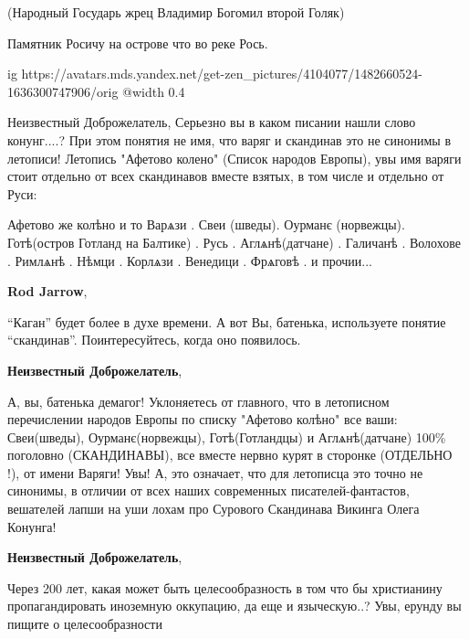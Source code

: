 \begin{itemize}
(Народный Государь жрец Владимир Богомил второй Голяк)

Памятник Росичу на острове что во реке Рось.

\ifcmt
  ig https://avatars.mds.yandex.net/get-zen_pictures/4104077/1482660524-1636300747906/orig
  @width 0.4
\fi


Неизвестный Доброжелатель, Серьезно вы в каком писании нашли слово конунг....?
При этом понятия не имя, что варяг и скандинав это не синонимы в летописи!
Летопись "Афетово колено" (Список народов Европы), увы имя варяги стоит
отдельно от всех скандинавов вместе взятых, в том числе и отдельно от Руси:

Афетово же колѣно и то Варѧзи . Свеи (шведы). Оурманє (норвежцы). Готѣ(остров
Готланд на Балтике) . Русь . Аглѧнѣ(датчане) . Галичанѣ . Волохове . Римлѧнѣ .
Нѣмци . Корлѧзи . Венедици . Фрѧговѣ . и прочии...

\textbf{Rod Jarrow},

\enquote{Каган} будет более в духе времени. А вот Вы, батенька, используете
понятие \enquote{скандинав}. Поинтересуйтесь, когда оно появилось.

\textbf{Неизвестный Доброжелатель}, 

А, вы, батенька демагог! Уклоняетесь от главного, что в летописном перечислении
народов Европы по списку "Афетово колѣно" все ваши: Свеи(шведы),
Оурманє(норвежцы), Готѣ(Готландцы) и Аглѧнѣ(датчане) 100\% поголовно
(СКАНДИНАВЫ), все вместе нервно курят в сторонке (ОТДЕЛЬНО !), от имени Варяги!
Увы! А, это означает, что для летописца это точно не синонимы, в отличии от
всех наших современных писателей-фантастов, вешателей лапши на уши лохам про
Сурового Скандинава Викинга Олега Конунга!

\textbf{Неизвестный Доброжелатель}, 

Через 200 лет, какая может быть целесообразность в том что бы христианину
пропагандировать иноземную оккупацию, да еще и языческую..? Увы, ерунду вы
пищите о целесообразности

\end{itemize} %
